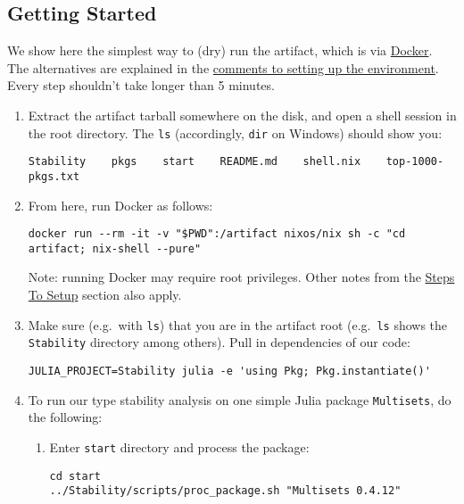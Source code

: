 \documentclass[
]{article}
\author{}
\date{}
\begin{document}
\hypertarget{getting-started}{%
\subsection{Getting Started}\label{getting-started}}

We show here the simplest way to (dry) run the artifact, which is via
\href{https://docs.docker.com/get-docker/}{Docker}. The alternatives are
explained in the
\protect\hyperlink{comments-on-setting-up-environment}{comments to
setting up the environment}. Every step shouldn't take longer than 5
minutes.

\begin{enumerate}
\def\labelenumi{\arabic{enumi}.}
\item
  Extract the artifact tarball somewhere on the disk, and open a shell
  session in the root directory. The \texttt{ls} (accordingly,
  \texttt{dir} on Windows) should show you:

\begin{verbatim}
Stability    pkgs    start    README.md    shell.nix    top-1000-pkgs.txt
\end{verbatim}
\item
  From here, run Docker as follows:

\begin{verbatim}
docker run --rm -it -v "$PWD":/artifact nixos/nix sh -c "cd artifact; nix-shell --pure"
\end{verbatim}

  Note: running Docker may require root privileges. Other notes from the
  \protect\hyperlink{steps-to-setup}{Steps To Setup} section also apply.
\item
  Make sure (e.g.~with \texttt{ls}) that you are in the artifact root
  (e.g.~\texttt{ls} shows the \texttt{Stability} directory among
  others). Pull in dependencies of our code:

\begin{verbatim}
JULIA_PROJECT=Stability julia -e 'using Pkg; Pkg.instantiate()'
\end{verbatim}
\item
  To run our type stability analysis on one simple Julia package
  \texttt{Multisets}, do the following:

  \begin{enumerate}
  \def\labelenumii{\alph{enumii}.}
  \item
    Enter \texttt{start} directory and process the package:

\begin{verbatim}
cd start
../Stability/scripts/proc_package.sh "Multisets 0.4.12"
\end{verbatim}


\end{enumerate}
\end{enumerate}
\end{document}
